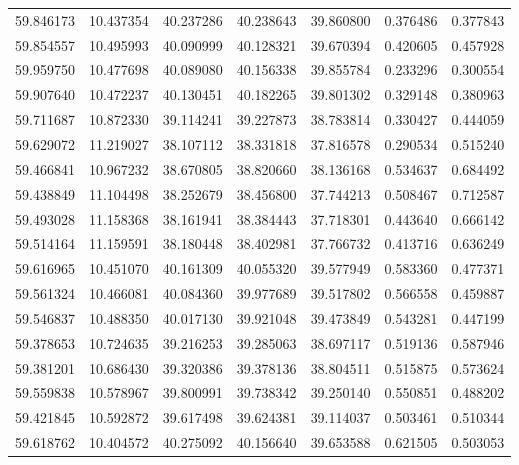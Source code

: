 \begin{tabular}{rrrrrrr}
 59.846173 &  10.437354 &         40.237286 &         40.238643 &         39.860800 &  0.376486 &  0.377843 \\
 59.854557 &  10.495993 &         40.090999 &         40.128321 &         39.670394 &  0.420605 &  0.457928 \\
 59.959750 &  10.477698 &         40.089080 &         40.156338 &         39.855784 &  0.233296 &  0.300554 \\
 59.907640 &  10.472237 &         40.130451 &         40.182265 &         39.801302 &  0.329148 &  0.380963 \\
 59.711687 &  10.872330 &         39.114241 &         39.227873 &         38.783814 &  0.330427 &  0.444059 \\
 59.629072 &  11.219027 &         38.107112 &         38.331818 &         37.816578 &  0.290534 &  0.515240 \\
 59.466841 &  10.967232 &         38.670805 &         38.820660 &         38.136168 &  0.534637 &  0.684492 \\
 59.438849 &  11.104498 &         38.252679 &         38.456800 &         37.744213 &  0.508467 &  0.712587 \\
 59.493028 &  11.158368 &         38.161941 &         38.384443 &         37.718301 &  0.443640 &  0.666142 \\
 59.514164 &  11.159591 &         38.180448 &         38.402981 &         37.766732 &  0.413716 &  0.636249 \\
 59.616965 &  10.451070 &         40.161309 &         40.055320 &         39.577949 &  0.583360 &  0.477371 \\
 59.561324 &  10.466081 &         40.084360 &         39.977689 &         39.517802 &  0.566558 &  0.459887 \\
 59.546837 &  10.488350 &         40.017130 &         39.921048 &         39.473849 &  0.543281 &  0.447199 \\
 59.378653 &  10.724635 &         39.216253 &         39.285063 &         38.697117 &  0.519136 &  0.587946 \\
 59.381201 &  10.686430 &         39.320386 &         39.378136 &         38.804511 &  0.515875 &  0.573624 \\
 59.559838 &  10.578967 &         39.800991 &         39.738342 &         39.250140 &  0.550851 &  0.488202 \\
 59.421845 &  10.592872 &         39.617498 &         39.624381 &         39.114037 &  0.503461 &  0.510344 \\
 59.618762 &  10.404572 &         40.275092 &         40.156640 &         39.653588 &  0.621505 &  0.503053 \\

\end{tabular}
